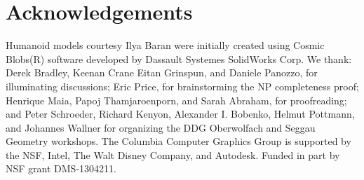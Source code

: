 \section*{Acknowledgements}
%
Humanoid models courtesy Ilya Baran were initially created using Cosmic
Blobs(R) software developed by Dassault Systemes SolidWorks Corp.
%
We thank: Derek Bradley, Keenan Crane Eitan Grinspun, and Daniele Panozzo, for
illuminating discussions;
%
Eric Price, for brainstorming the NP completeness proof;
%
Henrique Maia, Papoj Thamjaroenporn, and Sarah Abraham, for proofreading; and
Peter Schroeder, Richard Kenyon, Alexander I. Bobenko, Helmut Pottmann, and
Johannes Wallner for organizing the DDG Oberwolfach and Seggau Geometry
workshops.
%
The Columbia Computer Graphics Group is supported by the NSF, Intel, The Walt
Disney Company, and Autodesk.
%
Funded in part by NSF grant DMS-1304211.
